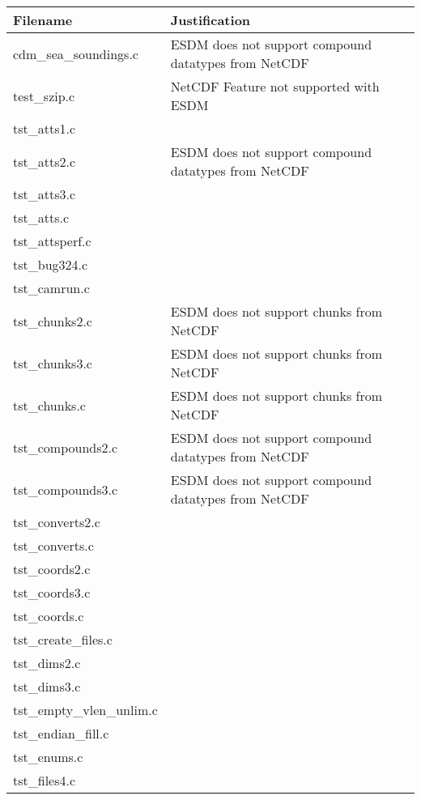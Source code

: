 \begin{table}[H]
\centering
\begin{tabular}{|l|l|}
\hline
Filename & Justification \\ \hline \hline
cdm\_sea\_soundings.c   & ESDM does not support compound datatypes from NetCDF          \\ \hline
test\_szip.c   &  NetCDF Feature not supported with ESDM         \\ \hline
tst\_atts1.c   &           \\ \hline
tst\_atts2.c   &  ESDM does not support compound datatypes from NetCDF         \\ \hline
tst\_atts3.c   &           \\ \hline
tst\_atts.c   &           \\ \hline
tst\_attsperf.c   &           \\ \hline
tst\_bug324.c   &           \\ \hline
tst\_camrun.c   &           \\ \hline
tst\_chunks2.c   &  ESDM does not support chunks from NetCDF         \\ \hline
tst\_chunks3.c   & ESDM does not support chunks from NetCDF       \\ \hline
tst\_chunks.c   &  ESDM does not support chunks from NetCDF       \\ \hline
tst\_compounds2.c   &  ESDM does not support compound datatypes from NetCDF         \\ \hline
tst\_compounds3.c   &  ESDM does not support compound datatypes from NetCDF         \\ \hline
tst\_converts2.c   &           \\ \hline
tst\_converts.c   &           \\ \hline
tst\_coords2.c   &           \\ \hline
tst\_coords3.c   &           \\ \hline
tst\_coords.c   &           \\ \hline
tst\_create\_files.c   &           \\ \hline
tst\_dims2.c   &       \\ \hline
tst\_dims3.c   &       \\ \hline
tst\_empty\_vlen\_unlim.c   &       \\ \hline
tst\_endian\_fill.c   &       \\ \hline
tst\_enums.c   &       \\ \hline
tst\_files4.c   &       \\ \hline

\end{tabular}
\end{table}

